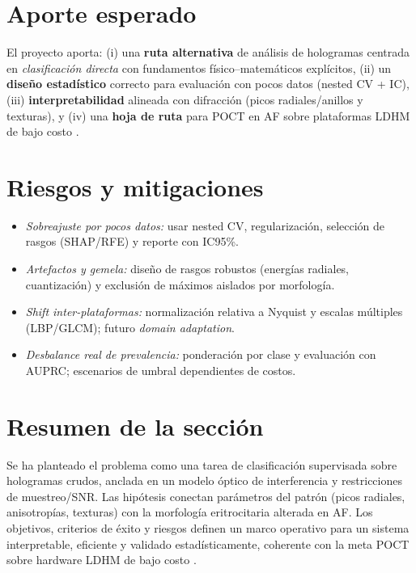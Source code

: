 \section{Aporte esperado}
El proyecto aporta: (i) una \textbf{ruta alternativa} de análisis de hologramas centrada en \emph{clasificación directa} con fundamentos físico–matemáticos explícitos, (ii) un \textbf{diseño estadístico} correcto para evaluación con pocos datos (nested CV + IC), (iii) \textbf{interpretabilidad} alineada con difracción (picos radiales/anillos y texturas), y (iv) una \textbf{hoja de ruta} para POCT en AF sobre plataformas LDHM de bajo costo \cite{Amann2019SciRep,BuitragoDuque2023HardwareX,Greenbaum2014STM,Tsamardinos2022Patterns,Chen2022Photonics}.

\section{Riesgos y mitigaciones}
\begin{itemize}
\item \emph{Sobreajuste por pocos datos:} usar nested CV, regularización, selección de rasgos (SHAP/RFE) y reporte con IC95\%.
\item \emph{Artefactos y gemela:} diseño de rasgos robustos (energías radiales, cuantización) y exclusión de máximos aislados por morfología.
\item \emph{Shift inter-plataformas:} normalización relativa a Nyquist y escalas múltiples (LBP/GLCM); futuro \emph{domain adaptation}.
\item \emph{Desbalance real de prevalencia:} ponderación por clase y evaluación con AUPRC; escenarios de umbral dependientes de costos.
\end{itemize}

\section{Resumen de la sección}
Se ha planteado el problema como una tarea de clasificación supervisada sobre hologramas crudos, anclada en un modelo óptico de interferencia y restricciones de muestreo/SNR. Las hipótesis conectan parámetros del patrón (picos radiales, anisotropías, texturas) con la morfología eritrocitaria alterada en AF. Los objetivos, criterios de éxito y riesgos definen un marco operativo para un sistema interpretable, eficiente y validado estadísticamente, coherente con la meta POCT sobre hardware LDHM de bajo costo \cite{Amann2019SciRep,BuitragoDuque2023HardwareX,Greenbaum2014STM,Chen2022Photonics,Tsamardinos2022Patterns}.
